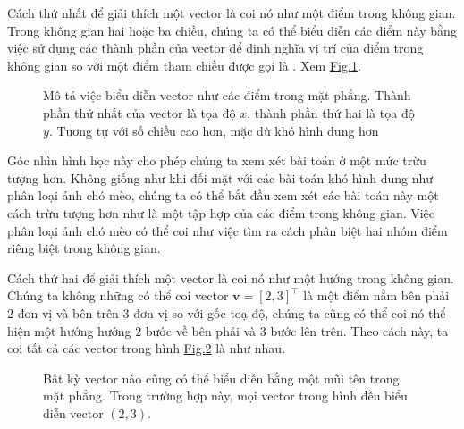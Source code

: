 \documentclass[letterpaper,11pt,english]{sphinxmanual}
\begin{document}
Cách thứ nhất để giải thích một vector là coi nó như một điểm trong
không gian. Trong không gian hai hoặc ba chiều, chúng ta có thể biểu
diễn các điểm này bằng việc sử dụng các thành phần của vector để định
nghĩa vị trí của điểm trong không gian so với một điểm tham chiều được
gọi là . Xem \hyperref[\detokenize{chapter_appendix_math/geometry-linear-algebric-ops_vn:fig-grid}]{Fig.\@ \ref{\detokenize{chapter_appendix_math/geometry-linear-algebric-ops_vn:fig-grid}}}.



\begin{figure}[H]
\centering
\capstart

\noindent{}
\caption{Mô tả việc biểu diễn vector như các điểm trong mặt phẳng. Thành phần
thứ nhất của vector là tọa độ \(x\), thành phần thứ hai là tọa độ
\(y\). Tương tự với số chiều cao hơn, mặc dù khó hình dung hơn}\label{\detokenize{chapter_appendix_math/geometry-linear-algebric-ops_vn:id3}}\label{\detokenize{chapter_appendix_math/geometry-linear-algebric-ops_vn:fig-grid}}\end{figure}



Góc nhìn hình học này cho phép chúng ta xem xét bài toán ở một mức trừu
tượng hơn. Không giống như khi đối mặt với các bài toán khó hình dung
như phân loại ảnh chó mèo, chúng ta có thể bắt đầu xem xét các bài toán
này một cách trừu tượng hơn như là một tập hợp của các điểm trong không
gian. Việc phân loại ảnh chó mèo có thể coi như việc tìm ra cách phân
biệt hai nhóm điểm riêng biệt trong không gian.





Cách thứ hai để giải thích một vector là coi nó như một hướng trong
không gian. Chúng ta không những có thể coi vector
\(\mathbf{v} = [2,3]^\top\) là một điểm nằm bên phải \(2\) đơn
vị và bên trên \(3\) đơn vị so với gốc toạ độ, chúng ta cũng có thể
coi nó thể hiện một hướng \textendash{} hướng \(2\) bước về bên phải và
\(3\) bước lên trên. Theo cách này, ta coi tất cả các vector trong
hình \hyperref[\detokenize{chapter_appendix_math/geometry-linear-algebric-ops_vn:fig-arrow}]{Fig.\@ \ref{\detokenize{chapter_appendix_math/geometry-linear-algebric-ops_vn:fig-arrow}}} là như nhau.



\begin{figure}[H]
\centering
\capstart

\noindent{}
\caption{Bất kỳ vector nào cũng có thể biểu diễn bằng một mũi tên trong mặt
phẳng. Trong trường hợp này, mọi vector trong hình đều biểu diễn
vector \((2,3)\).}\label{\detokenize{chapter_appendix_math/geometry-linear-algebric-ops_vn:id4}}\label{\detokenize{chapter_appendix_math/geometry-linear-algebric-ops_vn:fig-arrow}}\end{figure}
\end{document}
